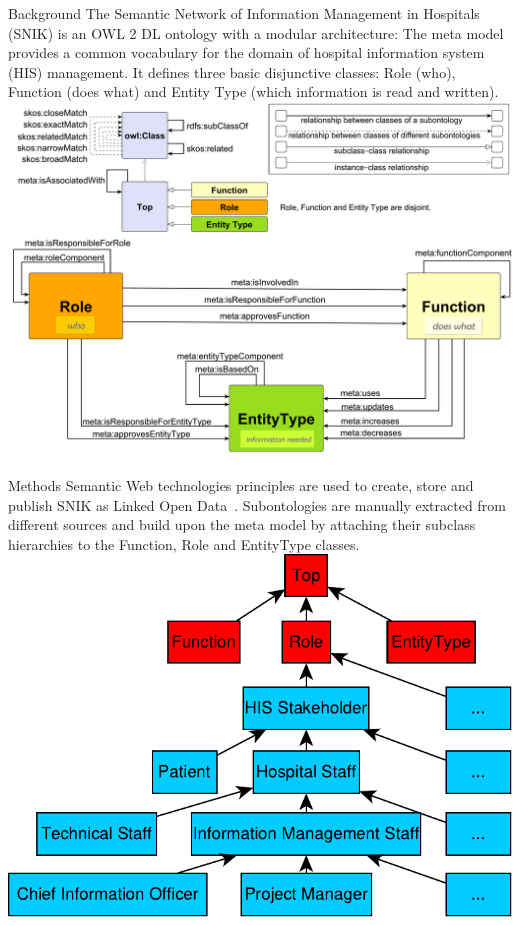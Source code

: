 \documentclass[portrait,final,a0paper,fontscale=0.310]{imiseposter}
\begin{document}
\begin{poster}
\begin{posterbox}[name=background,column=0,row=0]{Background}
The Semantic Network of Information Management in Hospitals (SNIK) is an OWL 2 DL ontology with a modular architecture:
The meta model provides a common vocabulary for the domain of hospital information system (HIS) management.
It defines three basic disjunctive classes: Role (who), Function (does what) and Entity Type (which information is read and written). %
\includegraphics[width=1.01\columnwidth]{img/metamodel9s.pdf}
\vspace{0.3em}
\end{posterbox}
\begin{posterbox}[name=methods,below=background]{Methods}
Semantic Web technologies principles are used to create, store and publish SNIK as Linked Open Data~\cite{sniktec}.
Subontologies are manually extracted from different sources and build upon the meta model by attaching their subclass hierarchies to the Function, Role and EntityType classes.
{\centering\includegraphics[width=0.8\columnwidth]{img/hierarchy.pdf}}

\end{posterbox}
\end{poster}
\end{document}
